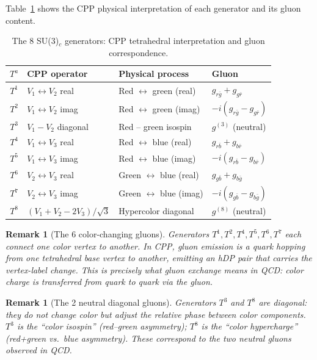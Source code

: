 \documentclass[11pt,a4paper]{article}
\newtheorem{remark}[theorem]{Remark}
\begin{document}
Table~\ref{tab:generators} shows the CPP physical interpretation
of each generator and its gluon content.

\begin{table}[H]
\centering
\caption{The 8 SU(3)$_c$ generators: CPP tetrahedral interpretation
  and gluon correspondence.}
\label{tab:generators}
\begin{tabular}{@{}clll@{}}
\toprule
$T^a$ & CPP operator & Physical process & Gluon \\
\midrule
$T^1$ & $V_1 \leftrightarrow V_2$ real & Red $\leftrightarrow$ green (real) & $g_{r\bar{g}} + g_{g\bar{r}}$ \\
$T^2$ & $V_1 \leftrightarrow V_2$ imag & Red $\leftrightarrow$ green (imag) & $-i(g_{r\bar{g}} - g_{g\bar{r}})$ \\
$T^3$ & $V_1 - V_2$ diagonal & Red -- green isospin & $g^{(3)}$ (neutral) \\
$T^4$ & $V_1 \leftrightarrow V_3$ real & Red $\leftrightarrow$ blue (real) & $g_{r\bar{b}} + g_{b\bar{r}}$ \\
$T^5$ & $V_1 \leftrightarrow V_3$ imag & Red $\leftrightarrow$ blue (imag) & $-i(g_{r\bar{b}} - g_{b\bar{r}})$ \\
$T^6$ & $V_2 \leftrightarrow V_3$ real & Green $\leftrightarrow$ blue (real) & $g_{g\bar{b}} + g_{b\bar{g}}$ \\
$T^7$ & $V_2 \leftrightarrow V_3$ imag & Green $\leftrightarrow$ blue (imag) & $-i(g_{g\bar{b}} - g_{b\bar{g}})$ \\
$T^8$ & $(V_1+V_2-2V_3)/\sqrt{3}$ & Hypercolor diagonal & $g^{(8)}$ (neutral) \\
\bottomrule
\end{tabular}
\end{table}

\begin{remark}[The 6 color-changing gluons]
Generators $T^1, T^2, T^4, T^5, T^6, T^7$ each connect one color
vertex to another.  In CPP, gluon emission is a quark hopping from
one tetrahedral base vertex to another, emitting an hDP pair that
carries the vertex-label change.  This is precisely what gluon
exchange means in QCD: color charge is transferred from quark to
quark via the gluon.
\end{remark}

\begin{remark}[The 2 neutral diagonal gluons]
Generators $T^3$ and $T^8$ are diagonal: they do not change
color but adjust the relative phase between color components.
$T^3$ is the ``color isospin'' (red--green asymmetry);
$T^8$ is the ``color hypercharge'' (red+green vs.\ blue asymmetry).
These correspond to the two neutral gluons observed in QCD.
\end{remark}
\end{document}
